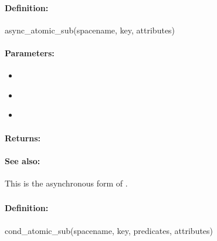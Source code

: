 \paragraph{Definition:}
\begin{rubycode}
async_atomic_sub(spacename, key, attributes)
\end{rubycode}

\paragraph{Parameters:}
\begin{itemize}[noitemsep]
\item {}\\

\item {}\\

\item {}\\

\end{itemize}

\paragraph{Returns:}


\paragraph{See also:}  This is the asynchronous form of .

\pagebreak
\subsubsection{}
\label{api:ruby:cond_atomic_sub}


\paragraph{Definition:}
\begin{rubycode}
cond_atomic_sub(spacename, key, predicates, attributes)
\end{rubycode}

